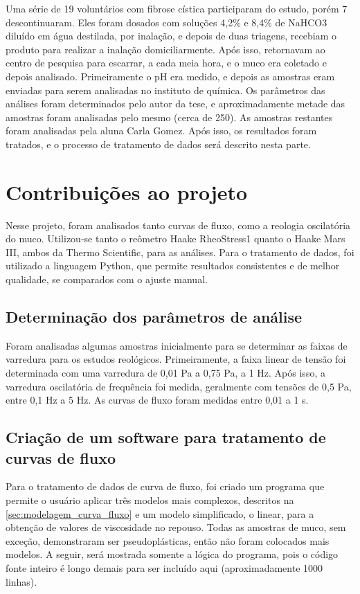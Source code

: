 	Uma série de 19 voluntários com fibrose cística participaram do estudo, porém 7 descontinuaram. Eles foram dosados com soluções 4,2\% e 8,4\% de NaHCO3 diluído em água destilada, por inalação, e depois de duas triagens, recebiam o produto para realizar a inalação domiciliarmente. Após isso, retornavam ao centro de pesquisa para escarrar, a cada meia hora, e o muco era coletado e depois analisado. Primeiramente o pH era medido, e depois as amostras eram enviadas para serem analisadas no instituto de química. Os parâmetros das análises foram determinados pelo autor da tese, e aproximadamente metade das amostras foram analisadas pelo mesmo (cerca de 250). As amostras restantes foram analisadas pela aluna Carla Gomez. Após isso, os resultados foram tratados, e o processo de tratamento de dados será descrito nesta parte.


	\chapter{Contribuições ao projeto}
	
	Nesse projeto, foram analisados tanto curvas de fluxo, como a reologia oscilatória do muco. Utilizou-se tanto o reômetro Haake RheoStress1 quanto o Haake Mars III, ambos da Thermo Scientific, para as análises. Para o tratamento de dados, foi utilizado a linguagem Python, que permite resultados consistentes e de melhor qualidade, se comparados com o ajuste manual.
	
		\section{Determinação dos parâmetros de análise}
		
		Foram analisadas algumas amostras inicialmente para se determinar as faixas de varredura para os estudos reológicos. Primeiramente, a faixa linear de tensão foi determinada com uma varredura de 0,01 Pa a 0,75 Pa, a 1 Hz. Após isso, a varredura oscilatória de frequência foi medida, geralmente com tensões de 0,5 Pa, entre 0,1 Hz a 5 Hz. As curvas de fluxo foram medidas entre 0,01 a 1 s\menosUm.
	
		\section{Criação de um software para tratamento de curvas de fluxo}
		\label{sec:apn_tratamento_CF}
		Para o tratamento de dados de curva de fluxo, foi criado um programa que permite o usuário aplicar três modelos mais complexos, descritos na \autoref{sec:modelagem_curva_fluxo} e um modelo simplificado, o linear, para a obtenção de valores de viscosidade no repouso. Todas as amostras de muco, sem exceção, demonstraram ser pseudoplásticas, então não foram colocados mais modelos. A seguir, será mostrada somente a lógica do programa, pois o código fonte inteiro é longo demais para ser incluído aqui (aproximadamente 1000 linhas).
		
